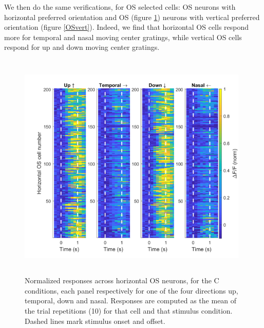 We then do the same verifications, for OS selected cells: OS neurons with horizontal preferred orientation and  OS (figure \ref{OShorz}) neurons with vertical preferred orientation (figure \ref{OSvert}). Indeed, we find that horizontal OS cells respond more for temporal and nasal moving center gratings, while vertical OS cells respond for up and down moving center gratings.
\vspace*{-0.4cm}
\begin{figure}[H] \centering \includegraphics[width=11cm,height=11cm,keepaspectratio]{Figures/7.Results/finalPopulation/sel/popPlots_horzOS_centerOnly.png} 
\vspace*{-0.2cm}\caption{Normalized responses across horizontal OS neurons, for the C conditions, each panel respectively for one of the four directions up, temporal, down and nasal. Responses are computed as the mean of the trial repetitions (10) for that cell and that stimulus condition. Dashed lines mark stimulus onset and offset.} \label{OShorz}
\end{figure}
\vspace*{-0.4cm}
